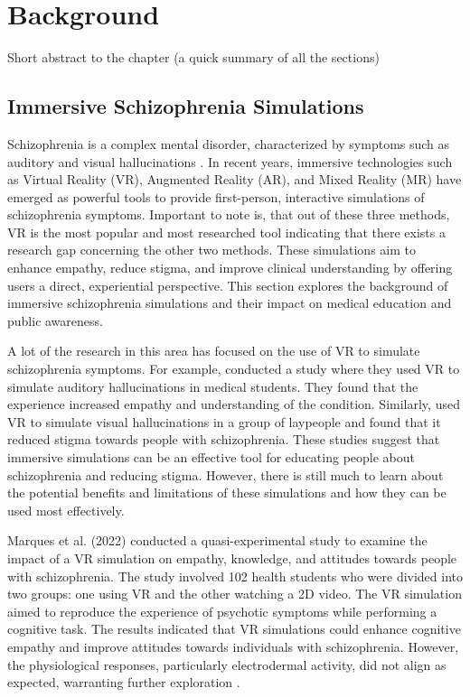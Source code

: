 \chapter{Background}
\label{ch:background}

Short abstract to the chapter (a quick summary of all the sections)

\section{Immersive Schizophrenia Simulations}
Schizophrenia is a complex mental disorder, characterized by symptoms such as auditory and visual hallucinations \cite{Silverstein2021}. In recent years, immersive technologies such as Virtual Reality (VR), Augmented Reality (AR), and Mixed Reality (MR) have emerged as powerful tools to provide first-person, interactive simulations of schizophrenia symptoms. Important to note is, that out of these three methods, VR is the most popular and most researched tool \cite{Kuhail2022} indicating that there exists a research gap concerning the other two methods. These simulations aim to enhance empathy, reduce stigma, and improve clinical understanding by offering users a direct, experiential perspective. This section explores the background of immersive schizophrenia simulations and their impact on medical education and public awareness.


A lot of the research in this area has focused on the use of VR to simulate schizophrenia symptoms. For example, \cite{Kuhail2022} conducted a study where they used VR to simulate auditory hallucinations in medical students. They found that the experience increased empathy and understanding of the condition. Similarly, \cite{Silverstein2021} used VR to simulate visual hallucinations in a group of laypeople and found that it reduced stigma towards people with schizophrenia. These studies suggest that immersive simulations can be an effective tool for educating people about schizophrenia and reducing stigma. However, there is still much to learn about the potential benefits and limitations of these simulations and how they can be used most effectively.

Marques et al. (2022) conducted a quasi-experimental study to examine the impact of a VR simulation on empathy, knowledge, and attitudes towards people with schizophrenia. The study involved 102 health students who were divided into two groups: one using VR and the other watching a 2D video. The VR simulation aimed to reproduce the experience of psychotic symptoms while performing a cognitive task. The results indicated that VR simulations could enhance cognitive empathy and improve attitudes towards individuals with schizophrenia. However, the physiological responses, particularly electrodermal activity, did not align as expected, warranting further exploration \cite{Marques2022}.


